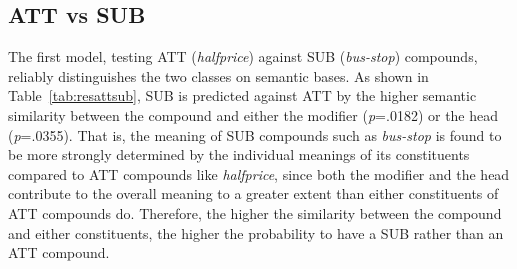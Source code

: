 \documentclass[output=paper]{langsci/langscibook}
\begin{document}
\begin{table}[t]
\caption{Results of the logit model opposing ATT (1) to SUB (0).\label{tab:resattsub}}
\end{table}

\subsection{ATT vs SUB}

The first model, testing ATT (\emph{halfprice}) against SUB (\emph{bus-stop}) compounds, reliably distinguishes the two classes on semantic bases. As shown in Table~\ref{tab:resattsub}, SUB is predicted against ATT by the higher semantic similarity between the compound and either the modifier (\emph{p}=.0182) or the head (\emph{p}=.0355). That is, the meaning of SUB compounds such as \emph{bus-stop} is found to be more strongly determined by the individual meanings of its constituents compared to ATT compounds like \emph{halfprice}, since both the modifier and the head contribute to the overall meaning to a greater extent than either constituents of ATT compounds do. Therefore, the higher the similarity between the compound and either constituents, the higher the probability to have a SUB rather than an ATT compound.
\end{document}
